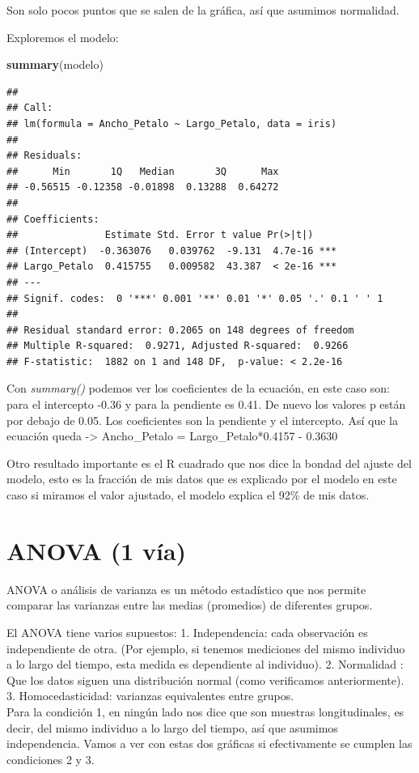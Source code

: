 \documentclass[
]{book}
\newenvironment{Shaded}{\begin{snugshade}}{\end{snugshade}}
\newcommand{\FunctionTok}[1]{\textcolor[rgb]{0.13,0.29,0.53}{\textbf{#1}}}
\newcommand{\NormalTok}[1]{#1}
\begin{document}
Son solo pocos puntos que se salen de la gráfica, así que asumimos normalidad.

Exploremos el modelo:

\begin{Shaded}
\begin{Highlighting}[]
\FunctionTok{summary}\NormalTok{(modelo)}
\end{Highlighting}
\end{Shaded}

\begin{verbatim}
## 
## Call:
## lm(formula = Ancho_Petalo ~ Largo_Petalo, data = iris)
## 
## Residuals:
##      Min       1Q   Median       3Q      Max 
## -0.56515 -0.12358 -0.01898  0.13288  0.64272 
## 
## Coefficients:
##               Estimate Std. Error t value Pr(>|t|)    
## (Intercept)  -0.363076   0.039762  -9.131  4.7e-16 ***
## Largo_Petalo  0.415755   0.009582  43.387  < 2e-16 ***
## ---
## Signif. codes:  0 '***' 0.001 '**' 0.01 '*' 0.05 '.' 0.1 ' ' 1
## 
## Residual standard error: 0.2065 on 148 degrees of freedom
## Multiple R-squared:  0.9271, Adjusted R-squared:  0.9266 
## F-statistic:  1882 on 1 and 148 DF,  p-value: < 2.2e-16
\end{verbatim}

Con \emph{summary()} podemos ver los coeficientes de la ecuación, en este caso son: para el intercepto -0.36 y para la pendiente es 0.41.
De nuevo los valores p están por debajo de 0.05.
Los coeficientes son la pendiente y el intercepto.
Así que la ecuación queda -\textgreater{} Ancho\_Petalo = Largo\_Petalo*0.4157 - 0.3630

Otro resultado importante es el R cuadrado que nos dice la bondad del ajuste del modelo, esto es la fracción de mis datos que es explicado por el modelo en este caso si miramos el valor ajustado, el modelo explica el 92\% de mis datos.

\section{ANOVA (1 vía)}\label{anova-1-vuxeda}

ANOVA o análisis de varianza es un método estadístico que nos permite comparar las varianzas entre las medias (promedios) de diferentes grupos.

El ANOVA tiene varios supuestos: 1.
Independencia: cada observación es independiente de otra.
(Por ejemplo, si tenemos mediciones del mismo individuo a lo largo del tiempo, esta medida es dependiente al individuo).
2.
Normalidad : Que los datos siguen una distribución normal (como verificamos anteriormente).
3.
Homocedasticidad: varianzas equivalentes entre grupos.\\
Para la condición 1, en ningún lado nos dice que son muestras longitudinales, es decir, del mismo individuo a lo largo del tiempo, así que asumimos independencia.
Vamos a ver con estas dos gráficas si efectivamente se cumplen las condiciones 2 y 3.
\end{document}
